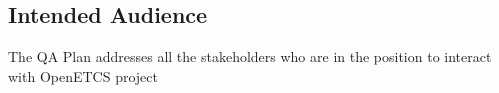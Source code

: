 \documentclass{template/openetcs_article}
\begin{document}



\subsection{Intended Audience}




The QA Plan addresses all the stakeholders who are in the position to interact with OpenETCS project
\end{document}
